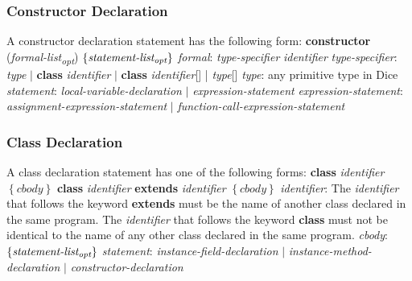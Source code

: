 \begin{homeworkProblem}
	\subsubsection{Constructor Declaration}
	A constructor declaration statement has the following form:
	\newline
	\textbf{constructor} (\textit{formal-list\textsubscript{opt}}) $\left\{ \textit{statement-list\textsubscript{opt}} \right\}$
	\newline
	\textit{formal}: \textit{type-specifier} \textit{identifier}
	\newline
	\textit{type-specifier}: \textit{type} $|$ \textbf{class} \textit{identifier} $|$ \textbf{class} \textit{identifier}[] | \textit{type}[]
	\newline
	\textit{type}: any primitive type in Dice
	\newline
	\textit{statement}: \textit{local-variable-declaration} $|$ \textit{expression-statement}
	\newline
	\textit{expression-statement}: \textit{assignment-expression-statement} $|$ \textit{function-call-expression-statement}
	
	\subsubsection{Class Declaration}
	A class declaration statement has one of the following forms:
	\newline
	\textbf{class} \textit{identifier} $\left\{ \textit{cbody} \right\}$
	\newline
	\textbf{class} \textit{identifier} \textbf{extends} \textit{identifier} $\left\{ \textit{cbody} \right\}$
	\newline
	\textit{identifier}: The \textit{identifier} that follows the keyword \textbf{extends} must be the name of another class declared in the same program. The \textit{identifier} that follows the keyword \textbf{class} must not be identical to the name of any other class declared in the same program.
	\newline
	\textit{cbody}: $\left\{ \textit{statement-list\textsubscript{opt}} \right\}$
	\newline
	\textit{statement}: \textit{instance-field-declaration} $|$ \textit{instance-method-declaration} $|$ \textit{constructor-declaration}
	
\end{homeworkProblem}
